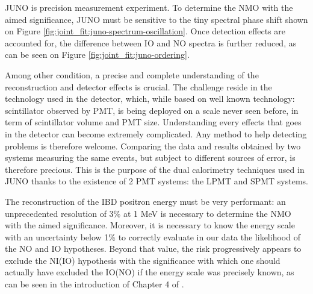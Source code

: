 \documentclass[../main.tex]{subfiles}
\begin{document}
JUNO is  precision measurement experiment.
To determine the NMO with the aimed significance, JUNO must be sensitive to the tiny spectral phase shift shown on Figure \ref{fig:joint_fit:juno-spectrum-oscillation}.
Once detection effects are accounted for, the difference between IO and NO spectra is further reduced, as can be seen on Figure \ref{fig:joint_fit:juno-ordering}.

Among other condition, a precise and complete understanding of the reconstruction and detector effects is crucial.
The challenge reside in the technology used in the detector, which, while based on well known technology: scintillator observed by PMT, is being deployed on a scale never seen before, in term of scintillator volume and  PMT size. Understanding every effects that goes in the detector can become extremely complicated. Any method to help detecting problems is therefore welcome.
Comparing the data and results obtained by two systems measuring the same events, but subject to different sources of error, is therefore precious. This is the purpose of the dual calorimetry techniques used in JUNO thanks to the existence of 2 PMT systems: the LPMT and SPMT systems.

The reconstruction of the IBD positron energy must be very performant: an unprecedented resolution of 3\% at 1 MeV \cite{juno_collaboration_juno_2022} is necessary to determine the NMO with the aimed significance.
Moreover, it is necessary to know the energy scale with an uncertainty below 1\% to correctly evaluate in our data the likelihood of the NO and IO  hypotheses. Beyond that value, the risk progressively appears to exclude the NI(IO) hypothesis with the significance with which  one should actually have excluded the IO(NO) if the energy scale was precisely known, as can be seen in the introduction of Chapter 4 of \cite{han_dual_2021}.
\end{document}
